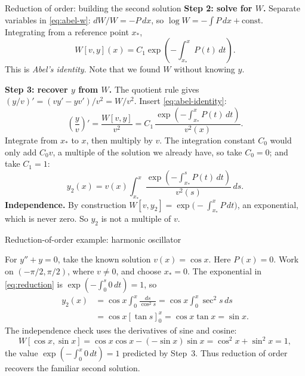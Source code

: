 \documentclass[11pt]{beamer}
\begin{document}
\begin{frame}[allowframebreaks=1.00]{Reduction of order: building the second solution}
\textbf{Step 2: solve for \(W\).} Separate variables in \eqref{eq:abel-w}: \(dW/W=-P\,dx\), so
\(\log W=-\int P\,dx+\text{const}\). Integrating from a reference point \(x_*\),
\begin{equation}
  W[v,y](x)=C_1
  \exp\left(-\int_{x_*}^{x}P(t)\,dt\right).
  \label{eq:abel-identity}
\end{equation}
This is \emph{Abel's identity}. Note that we found \(W\) without knowing \(y\).
\par\framebreak\par
\textbf{Step 3: recover \(y\) from \(W\).} The quotient rule gives
\((y/v)'=(vy'-yv')/v^2=W/v^2\). Insert \eqref{eq:abel-identity}:
\[
  \left(\frac{y}{v}\right)'
    =\frac{W[v,y]}{v^2}
    =C_1\,\frac{\exp\left(-\int_{x_*}^{x}P(t)\,dt\right)}{v^2(x)}.
\]
Integrate from \(x_*\) to \(x\), then multiply by \(v\). The integration constant \(C_0\) would only add
\(C_0v\), a multiple of the solution we already have, so take \(C_0=0\); and take \(C_1=1\):
\begin{equation}
 y_2(x)=v(x)\int_{x_*}^x
 \frac{\exp\left(-\int_{x_*}^sP(t)\,dt\right)}{v^2(s)}\,ds.
 \label{eq:reduction}
\end{equation}
\textbf{Independence.} By construction \(W[v,y_2]=\exp\bigl(-\int_{x_*}^{x}P\,dt\bigr)\), an exponential,
which is never zero. So \(y_2\) is not a multiple of \(v\).
\end{frame}

\begin{frame}{Reduction-of-order example: harmonic oscillator}
\footnotesize

For $y''+y=0$, take the known solution $v(x)=\cos x$. Here $P(x)=0$.
Work on $(-\pi/2,\pi/2)$, where $v\ne0$, and choose $x_*=0$.
The exponential in \eqref{eq:reduction} is $\exp(-\int_0^s0\,dt)=1$, so
\[
\begin{aligned}
 y_2(x)&=\cos x\int_0^x\frac{ds}{\cos^2s}
       =\cos x\int_0^x\sec^2s\,ds\\
       &=\cos x[\tan s]_0^x
        =\cos x\tan x=\sin x.
\end{aligned}
\]
The independence check uses the derivatives of sine and cosine:
\[
 W[\cos x,\sin x]
 =\cos x\cos x-(-\sin x)\sin x=\cos^2x+\sin^2x=1,
\]
the value $\exp(-\int_0^x0\,dt)=1$ predicted by Step~3.
Thus reduction of order recovers the familiar second solution.
\end{frame}
\end{document}
